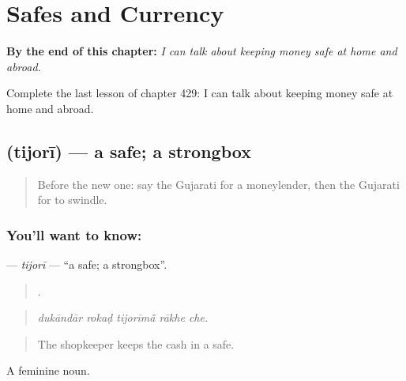 
\chapter{Safes and Currency}
\label{ch:gu-safes-and-currency}

\begin{chapteropening}
\textbf{By the end of this chapter:} \emph{I can talk about keeping money safe at home and abroad.}

Complete the last lesson of chapter 429: I can talk about keeping money safe at home and abroad.
\end{chapteropening}

\section[\texorpdfstring{\gu{તિજોરી} (tijorī)}{તિજોરી (tijorī)}]{ (tijorī) — a safe; a strongbox}

\label{lesson:GU-C429-tijori}



\begin{quote}
Before the new one: say the Gujarati for a moneylender, then the Gujarati for to swindle.
\end{quote}

\subsection*{You'll want to know: }
\textbf{} — \emph{tijorī} — \textquotedblleft{}a safe; a strongbox\textquotedblright{}.

\begin{quote}
    .
\end{quote}

\begin{quote}
\emph{dukāndār rokaḍ tijorīmā̃ rākhe che.}
\end{quote}

\begin{quote}
The shopkeeper keeps the cash in a safe.
\end{quote}

A feminine noun.

